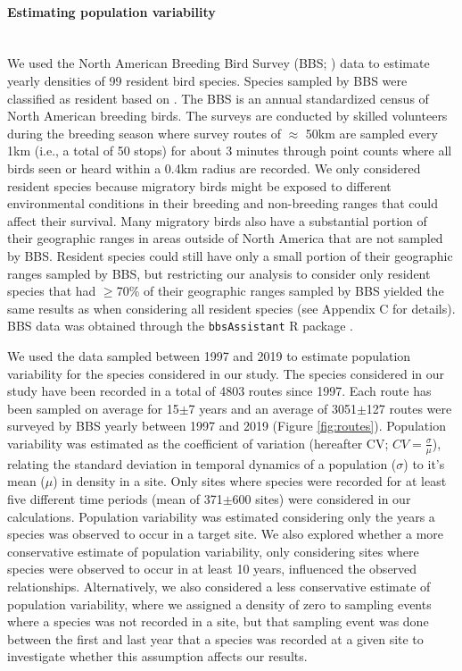 \paragraph*{Estimating population variability}\mbox{}\\ 
We used the North American Breeding Bird Survey (BBS; \textcite{sauer2020}) data to estimate yearly densities of 99 resident bird species. Species sampled by BBS were classified as resident based on \textcite{rosenberg2019}. The BBS is an annual standardized census of North American breeding birds. The surveys are conducted by skilled volunteers during the breeding season where survey routes of $\approx$ 50km are sampled every 1km (i.e., a total of 50 stops) for about 3 minutes through point counts where all birds seen or heard within a 0.4km radius are recorded. We only considered resident species because migratory birds might be exposed to different environmental conditions in their breeding and non-breeding ranges \parencite{ponti2020} that could affect their survival. Many migratory birds also have a substantial portion of their geographic ranges in areas outside of North America that are not sampled by BBS. Resident species could still have only a small portion of their geographic ranges sampled by BBS, but restricting our analysis to consider only resident species that had $\geq$70\% of their geographic ranges sampled by BBS yielded the same results as when considering all resident species (see Appendix C for details). BBS data was obtained through the \texttt{bbsAssistant} R package \parencite{burnett2019}.


We used the data sampled between 1997 and 2019 to estimate population variability for the  species considered in our study. The species considered in our study have been recorded in a total of 4803 routes since 1997. Each route has been sampled on average for 15$\pm$7 years and an average of 3051$\pm$127 routes were surveyed by BBS yearly between 1997 and 2019 (Figure \ref{fig:routes}). Population variability was estimated as the coefficient of variation (hereafter CV; $CV = \frac{\sigma}{\mu}$), relating the standard deviation in temporal dynamics of a population ($\sigma$) to it's mean ($\mu$) in density in a site. Only sites where species were recorded for at least five different time periods (mean of 371$\pm$600 sites) were considered in our calculations. Population variability was estimated considering only the years a species was observed to occur in a target site. We also explored whether a more conservative estimate of population variability, only considering sites where species were observed to occur in at least 10 years, influenced the observed relationships. Alternatively, we also considered a less conservative estimate of population variability, where we assigned a density of zero to sampling events where a species was not recorded in a site, but that sampling event was done between the first and last year that a species was recorded at a given site to investigate whether this assumption affects our results. %

